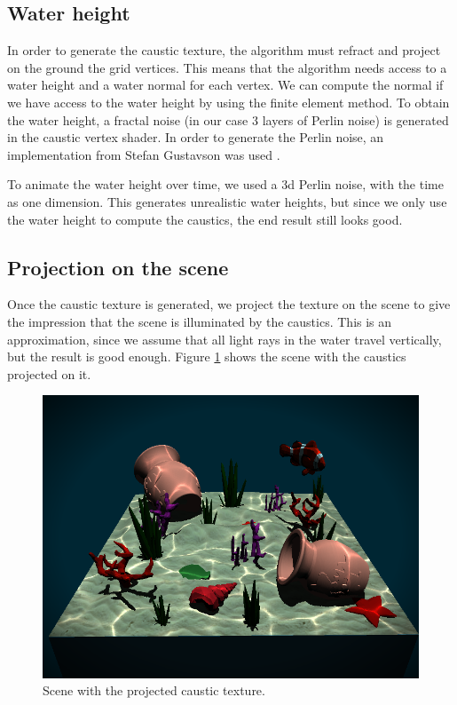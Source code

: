 \documentclass{article}
\begin{document}
\vspace{-1em}

\subsection{Water height}
In order to generate the caustic texture, the algorithm must refract and project on the ground 
the grid vertices. This means that the algorithm needs access to a water height and a water normal 
for each vertex. We can compute the normal if we have access to the water height by using the finite 
element method. To obtain the water height, a fractal noise (in our case 3 layers of Perlin noise) is 
generated in the caustic vertex shader. In order to generate the Perlin noise, an implementation from 
Stefan Gustavson was used \cite{perlin_noise}.

\medskip \par
\noindent
To animate the water height over time, we used a 3d Perlin noise, with the time as one dimension. 
This generates unrealistic water heights, but since we only use the water height to compute the caustics, 
the end result still looks good.

\subsection{Projection on the scene}
Once the caustic texture is generated, we project the texture on the scene to give the 
impression that the scene is illuminated by the caustics. This is an approximation, 
since we assume that all light rays in the water travel vertically, but the result is good enough. 
Figure \ref{fig:scene_with_caustics} shows the scene with the caustics projected on it.

\vspace{-0.5em}
\begin{figure}[h]
    \centering
    \includegraphics[width=\columnwidth]{imgs/scene_with_caustics.png}
    \caption{Scene with the projected caustic texture.}
    \label{fig:scene_with_caustics}
\end{figure}
\end{document}
